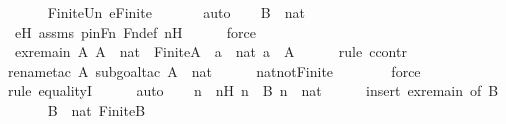 \begin{isabellebody}
\ \ \ \ \isamarkupfalse%
\ Finite{\isacharunderscore}{\kern0pt}Un\ e{\isacharunderscore}{\kern0pt}Finite\ \isanewline
\ \ \ \ \isamarkupfalse%
\ auto\isanewline
\isanewline
\ \ \isamarkupfalse%
\ {\isachardoublequoteopen}{\isacharquery}{\kern0pt}B\ {\isasymsubseteq}\ nat{\isachardoublequoteclose}\ \isanewline
\ \ \ \ \isamarkupfalse%
\ eH\ assms\ pinFn\ Fn{\isacharunderscore}{\kern0pt}def\ nH\isanewline
\ \ \ \ \isamarkupfalse%
\ force\ \ \isanewline
\isanewline
\ \ \isamarkupfalse%
\ ex{\isacharunderscore}{\kern0pt}remain{\isacharcolon}{\kern0pt}\ {\isachardoublequoteopen}{\isasymAnd}A{\isachardot}{\kern0pt}\ A\ {\isasymsubseteq}\ nat\ {\isasymLongrightarrow}\ Finite{\isacharparenleft}{\kern0pt}A{\isacharparenright}{\kern0pt}\ {\isasymLongrightarrow}\ {\isasymexists}a\ {\isasymin}\ nat{\isachardot}{\kern0pt}\ a\ {\isasymnotin}\ A{\isachardoublequoteclose}\ \isanewline
\ \ \ \ \isamarkupfalse%
{\isacharparenleft}{\kern0pt}rule\ ccontr{\isacharparenright}{\kern0pt}\isanewline
\ \ \ \ \isamarkupfalse%
{\isacharparenleft}{\kern0pt}rename{\isacharunderscore}{\kern0pt}tac\ A{\isacharcomma}{\kern0pt}\ subgoal{\isacharunderscore}{\kern0pt}tac\ {\isachardoublequoteopen}A\ {\isacharequal}{\kern0pt}\ nat{\isachardoublequoteclose}{\isacharparenright}{\kern0pt}\isanewline
\ \ \ \ \isamarkupfalse%
\ nat{\isacharunderscore}{\kern0pt}not{\isacharunderscore}{\kern0pt}Finite\ \isanewline
\ \ \ \ \ \isamarkupfalse%
\ force\ \isanewline
\ \ \ \ \isamarkupfalse%
{\isacharparenleft}{\kern0pt}rule\ equalityI{\isacharparenright}{\kern0pt}\isanewline
\ \ \ \ \isamarkupfalse%
\ auto\isanewline
\ \ \isamarkupfalse%
\ n{\isacharprime}{\kern0pt}\ \ n{\isacharprime}{\kern0pt}H{\isacharcolon}{\kern0pt}\ {\isachardoublequoteopen}n{\isacharprime}{\kern0pt}\ {\isasymnotin}\ {\isacharquery}{\kern0pt}B{\isachardoublequoteclose}\ {\isachardoublequoteopen}n{\isacharprime}{\kern0pt}\ {\isasymin}\ nat{\isachardoublequoteclose}\ \isanewline
\ \ \ \ \isamarkupfalse%
{\isacharparenleft}{\kern0pt}insert\ ex{\isacharunderscore}{\kern0pt}remain\ {\isacharbrackleft}{\kern0pt}of\ {\isacharquery}{\kern0pt}B{\isacharbrackright}{\kern0pt}{\isacharparenright}{\kern0pt}\isanewline
\ \ \ \ \isamarkupfalse%
\ {\isacartoucheopen}{\isacharquery}{\kern0pt}B\ {\isasymsubseteq}\ nat{\isacartoucheclose}\ {\isacartoucheopen}Finite{\isacharparenleft}{\kern0pt}{\isacharquery}{\kern0pt}B{\isacharparenright}{\kern0pt}{\isacartoucheclose}\isanewline

\end{isabellebody}
